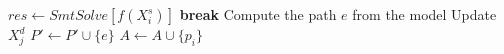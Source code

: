 	\STATE $res \gets SmtSolve\left[
	 f(X_i^s) 
	\right]$
		\STATE \textbf{break}
	\ENDIF
	\STATE Compute the path $e$ from the model
	\STATE Update $X^d_j$
	\STATE $P' \gets P' \cup \{e\}$
	\STATE $A \gets A \cup \{p_i\}$
\ENDWHILE
